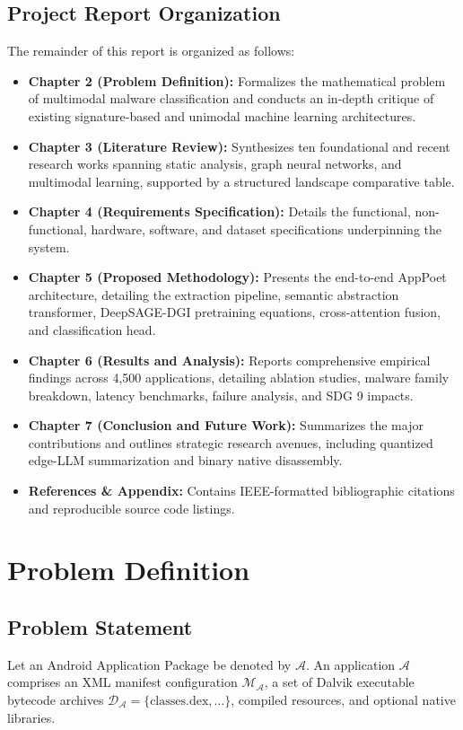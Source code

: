 \documentclass[12pt,a4paper,oneside]{report}
\begin{document}
\section{Project Report Organization}
The remainder of this report is organized as follows:
\begin{itemize}
    \item \textbf{Chapter 2 (Problem Definition):} Formalizes the mathematical problem of multimodal malware classification and conducts an in-depth critique of existing signature-based and unimodal machine learning architectures.
    \item \textbf{Chapter 3 (Literature Review):} Synthesizes ten foundational and recent research works spanning static analysis, graph neural networks, and multimodal learning, supported by a structured landscape comparative table.
    \item \textbf{Chapter 4 (Requirements Specification):} Details the functional, non-functional, hardware, software, and dataset specifications underpinning the system.
    \item \textbf{Chapter 5 (Proposed Methodology):} Presents the end-to-end AppPoet architecture, detailing the extraction pipeline, semantic abstraction transformer, DeepSAGE-DGI pretraining equations, cross-attention fusion, and classification head.
    \item \textbf{Chapter 6 (Results and Analysis):} Reports comprehensive empirical findings across 4,500 applications, detailing ablation studies, malware family breakdown, latency benchmarks, failure analysis, and SDG 9 impacts.
    \item \textbf{Chapter 7 (Conclusion and Future Work):} Summarizes the major contributions and outlines strategic research avenues, including quantized edge-LLM summarization and binary native disassembly.
    \item \textbf{References \& Appendix:} Contains IEEE-formatted bibliographic citations and reproducible source code listings.
\end{itemize}

\clearpage
\chapter{Problem Definition}
\section{Problem Statement}
Let an Android Application Package be denoted by $\mathcal{A}$. An application $\mathcal{A}$ comprises an XML manifest configuration $\mathcal{M}_{\mathcal{A}}$, a set of Dalvik executable bytecode archives $\mathcal{D}_{\mathcal{A}} = \{\text{classes.dex}, \dots\}$, compiled resources, and optional native libraries. 
\end{document}
